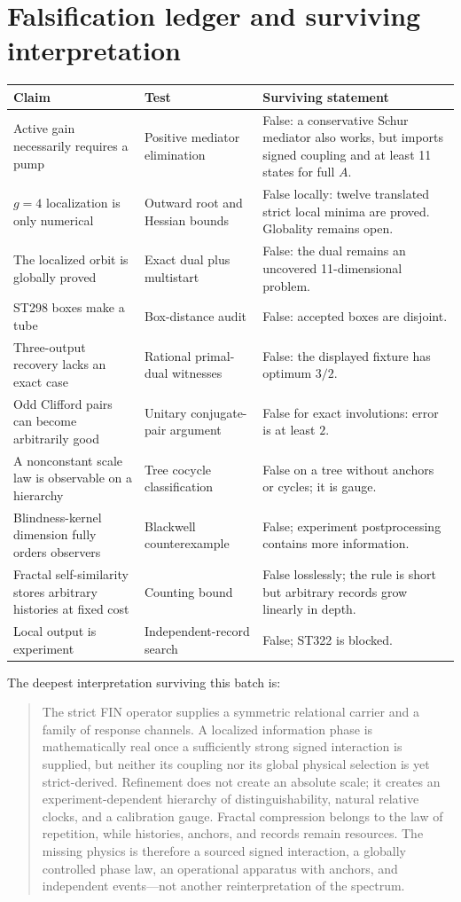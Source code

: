 \documentclass[11pt,a4paper]{article}
\begin{document}
\section{Falsification ledger and surviving interpretation}
\begin{longtable}{p{}p{}p{}}
\toprule Claim&Test&Surviving statement\\\midrule\endhead
Active gain necessarily requires a pump&Positive mediator elimination&False: a conservative Schur mediator also works, but imports signed coupling and at least 11 states for full $A$.\\
$g=4$ localization is only numerical&Outward root and Hessian bounds&False locally: twelve translated strict local minima are proved. Globality remains open.\\
The localized orbit is globally proved&Exact dual plus multistart&False: the dual remains an uncovered 11-dimensional problem.\\
ST298 boxes make a tube&Box-distance audit&False: accepted boxes are disjoint.\\
Three-output recovery lacks an exact case&Rational primal-dual witnesses&False: the displayed fixture has optimum $3/2$.\\
Odd Clifford pairs can become arbitrarily good&Unitary conjugate-pair argument&False for exact involutions: error is at least $2$.\\
A nonconstant scale law is observable on a hierarchy&Tree cocycle classification&False on a tree without anchors or cycles; it is gauge.\\
Blindness-kernel dimension fully orders observers&Blackwell counterexample&False; experiment postprocessing contains more information.\\
Fractal self-similarity stores arbitrary histories at fixed cost&Counting bound&False losslessly; the rule is short but arbitrary records grow linearly in depth.\\
Local output is experiment&Independent-record search&False; ST322 is blocked.\\
\bottomrule
\end{longtable}

The deepest interpretation surviving this batch is:
\begin{quote}
The strict FIN operator supplies a symmetric relational carrier and a family of response
channels. A localized information phase is mathematically real once a sufficiently strong
signed interaction is supplied, but neither its coupling nor its global physical selection
is yet strict-derived. Refinement does not create an absolute scale; it creates an
experiment-dependent hierarchy of distinguishability, natural relative clocks, and a
calibration gauge. Fractal compression belongs to the law of repetition, while histories,
anchors, and records remain resources. The missing physics is therefore a sourced signed
interaction, a globally controlled phase law, an operational apparatus with anchors, and
independent events---not another reinterpretation of the spectrum.
\end{quote}
\end{document}
